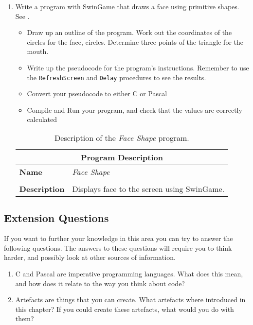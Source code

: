 \begin{enumerate}
  \item Write a program with SwinGame that draws a face using primitive shapes. See .
  \begin{itemize}
    \item Draw up an outline of the program. Work out the coordinates of the circles for the face, circles. Determine three points of the triangle for the mouth.
    \item Write up the pseudocode for the program's instructions. Remember to use the \texttt{RefreshScreen} and \texttt{Delay} procedures to see the results.
    \item Convert your pseudocode to either C or Pascal
    \item Compile and Run your program, and check that the values are correctly calculated
  \end{itemize}
  
  \begin{table}[h]
  \centering
  \begin{tabular}{l|p{12cm}}
    \hline
    \multicolumn{2}{c}{\textbf{Program Description}} \\
    \hline
    \textbf{Name} & \emph{Face Shape} \\
    \\
    \textbf{Description} & Displays face to the screen using SwinGame. \\
    \hline
  \end{tabular}
  \caption{Description of the \emph{Face Shape} program.}
  \label{tbl:face-shape}
  \end{table}
  
\end{enumerate}

\bigskip
\subsection{Extension Questions} %
\label{sub:extension_questions_pro}

If you want to further your knowledge in this area you can try to answer the following questions. The answers to these questions will require you to think harder, and possibly look at other sources of information.
\begin{enumerate}
  \item C and Pascal are imperative programming languages. What does this mean, and how does it relate to the way you think about code?
  \item Artefacts are things that you can create. What artefacts where introduced in this chapter? If you could create these artefacts, what would you do with them?
\end{enumerate}
